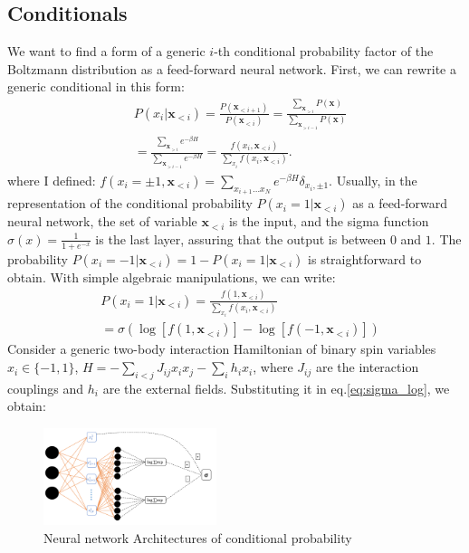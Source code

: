 \documentclass[aps,physrev,10pt,floatfix,longbibliography,nofootinbib,reprint]{revtex4-2}
\begin{document}
\subsection{Conditionals}
 We want to find a form of a generic $i$-th conditional probability factor of the Boltzmann distribution as a feed-forward neural network. First, we can rewrite a generic conditional in this form: 
\begin{equation}
    \label{eq:chain}
    \begin{split}
    & P\left(x_{i}|\mathbf{x}_{<i}\right)  = 
    \frac{P\left(\mathbf{x}_{<i+1}\right)}{P\left(\mathbf{x}_{<i}\right)}  = 
    \frac{\sum_{\mathbf{x}_{>i}}P\left(\mathbf{x}\right)}{\sum_{\mathbf{x}_{>i-1}}P\left(\mathbf{x}\right)} \\
    &=\frac{\sum_{\mathbf{x}_{>i}}e^{-\beta H}}{\sum_{\mathbf{x}_{>i-1}}e^{-\beta H}}  = 
    \frac{f\left(x_{i},\mathbf{x}_{<i}\right)}{\sum_{x_{i}}f\left(x_{i},\mathbf{x}_{<i}\right)}.
    \end{split}
\end{equation}
where I defined: $f\left(x_{i}=\pm 1,\mathbf{x}_{<i}\right) = \sum_{x_{i+1}\dots x_{N}}e^{-\beta H}\delta_{x_i, \pm1}$. Usually, in the representation of the conditional probability $P\left(x_{i}=1|\mathbf{x}_{<i}\right)$ as a feed-forward neural network, the set of variable $\mathbf{x}_{<i}$ is the input, and the sigma function $\sigma(x)=\frac{1}{1+e^{-x}}$ is the last layer, assuring that the output is between $0$ and $1$. The probability $P\left(x_{i}=-1|\mathbf{x}_{<i}\right) = 1 - P\left(x_{i}=1|\mathbf{x}_{<i}\right)$ is straightforward to obtain. With simple algebraic manipulations, we can write: 
\begin{equation}
    \label{eq:sigma_log}
    \begin{split}
    & P\left(x_{i}=1|\mathbf{x}_{<i}\right) = \frac{f\left(1,\mathbf{x}_{<i}\right)}{\sum_{x_{i}}f\left(x_{i},\mathbf{x}_{<i}\right)}\\
    &= \sigma\left(\log\left[f\left(1,\mathbf{x}_{<i}\right)\right]-\log\left[f\left(-1,\mathbf{x}_{<i}\right)\right]\right)
    \end{split}
\end{equation}
Consider a generic two-body interaction Hamiltonian of binary spin variables $x_i \in \{-1,1\}$, $H = -\sum_{i<j} J_{ij} x_i x_j - \sum_{i} h_i x_i$, where $J_{ij}$ are the interaction couplings and $h_i$ are the external fields. Substituting it in eq.\ref{eq:sigma_log}, we obtain:
\begin{figure}[!ht]
    \includegraphics[width=0.45\textwidth]{img/twoboghann.pdf}
    \caption{Neural network Architectures of conditional probability}
    \label{fig:arch}
\end{figure}
\end{document}
